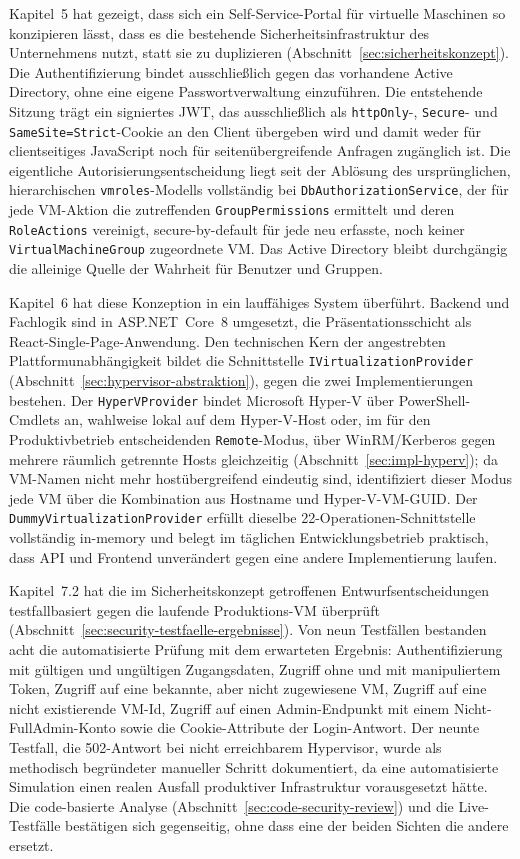 \documentclass[12pt,a4paper]{article}
\begin{document}
Kapitel~5 hat gezeigt, dass sich ein Self-Service-Portal für virtuelle Maschinen so konzipieren lässt, dass es die bestehende Sicherheitsinfrastruktur des Unternehmens nutzt, statt sie zu duplizieren (Abschnitt~\ref{sec:sicherheitskonzept}). Die Authentifizierung bindet ausschließlich gegen das vorhandene Active Directory, ohne eine eigene Passwortverwaltung einzuführen. Die entstehende Sitzung trägt ein signiertes JWT, das ausschließlich als \texttt{httpOnly}-, \texttt{Secure}- und \texttt{SameSite=Strict}-Cookie an den Client übergeben wird und damit weder für clientseitiges JavaScript noch für seitenübergreifende Anfragen zugänglich ist. Die eigentliche Autorisierungsentscheidung liegt seit der Ablösung des ursprünglichen, hierarchischen \texttt{vmroles}-Modells vollständig bei \texttt{DbAuthorizationService}, der für jede VM-Aktion die zutreffenden \texttt{GroupPermissions} ermittelt und deren \texttt{RoleActions} vereinigt, secure-by-default für jede neu erfasste, noch keiner \texttt{VirtualMachineGroup} zugeordnete VM. Das Active Directory bleibt durchgängig die alleinige Quelle der Wahrheit für Benutzer und Gruppen.

Kapitel~6 hat diese Konzeption in ein lauffähiges System überführt. Backend und Fachlogik sind in ASP.NET~Core~8 umgesetzt, die Präsentationsschicht als React-Single-Page-Anwendung. Den technischen Kern der angestrebten Plattformunabhängigkeit bildet die Schnittstelle \texttt{IVirtualizationProvider} (Abschnitt~\ref{sec:hypervisor-abstraktion}), gegen die zwei Implementierungen bestehen. Der \texttt{HyperVProvider} bindet Microsoft Hyper-V über PowerShell-Cmdlets an, wahlweise lokal auf dem Hyper-V-Host oder, im für den Produktivbetrieb entscheidenden \texttt{Remote}-Modus, über WinRM/Kerberos gegen mehrere räumlich getrennte Hosts gleichzeitig (Abschnitt~\ref{sec:impl-hyperv}); da VM-Namen nicht mehr hostübergreifend eindeutig sind, identifiziert dieser Modus jede VM über die Kombination aus Hostname und Hyper-V-VM-GUID. Der \texttt{DummyVirtualizationProvider} erfüllt dieselbe 22-Operationen-Schnittstelle vollständig in-memory und belegt im täglichen Entwicklungsbetrieb praktisch, dass API und Frontend unverändert gegen eine andere Implementierung laufen.

Kapitel~7.2 hat die im Sicherheitskonzept getroffenen Entwurfsentscheidungen testfallbasiert gegen die laufende Produktions-VM überprüft (Abschnitt~\ref{sec:security-testfaelle-ergebnisse}). Von neun Testfällen bestanden acht die automatisierte Prüfung mit dem erwarteten Ergebnis: Authentifizierung mit gültigen und ungültigen Zugangsdaten, Zugriff ohne und mit manipuliertem Token, Zugriff auf eine bekannte, aber nicht zugewiesene VM, Zugriff auf eine nicht existierende VM-Id, Zugriff auf einen Admin-Endpunkt mit einem Nicht-FullAdmin-Konto sowie die Cookie-Attribute der Login-Antwort. Der neunte Testfall, die 502-Antwort bei nicht erreichbarem Hypervisor, wurde als methodisch begründeter manueller Schritt dokumentiert, da eine automatisierte Simulation einen realen Ausfall produktiver Infrastruktur vorausgesetzt hätte. Die code-basierte Analyse (Abschnitt~\ref{sec:code-security-review}) und die Live-Testfälle bestätigen sich gegenseitig, ohne dass eine der beiden Sichten die andere ersetzt.
\end{document}
